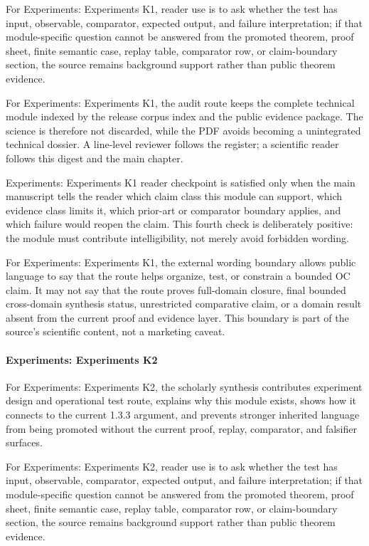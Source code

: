 For Experiments: Experiments K1, reader use is to ask whether the test has input, observable, comparator, expected output, and failure interpretation; if that module-specific question cannot be answered from the promoted theorem, proof sheet, finite semantic case, replay table, comparator row, or claim-boundary section, the source remains background support rather than public theorem evidence.


For Experiments: Experiments K1, the audit route keeps the complete technical module indexed by the release corpus index and the public evidence package. The science is therefore not discarded, while the PDF avoids becoming a unintegrated technical dossier. A line-level reviewer follows the register; a scientific reader follows this digest and the main chapter.


Experiments: Experiments K1 reader checkpoint is satisfied only when the main manuscript tells the reader which claim class this module can support, which evidence class limits it, which prior-art or comparator boundary applies, and which failure would reopen the claim. This fourth check is deliberately positive: the module must contribute intelligibility, not merely avoid forbidden wording.


For Experiments: Experiments K1, the external wording boundary allows public language to say that the route helps organize, test, or constrain a bounded OC claim. It may not say that the route proves full-domain closure, final bounded cross-domain synthesis status, unrestricted comparative claim, or a domain result absent from the current proof and evidence layer. This boundary is part of the source's scientific content, not a marketing caveat.


\paragraph{Experiments: Experiments K2}

For Experiments: Experiments K2, the scholarly synthesis contributes experiment design and operational test route, explains why this module exists, shows how it connects to the current 1.3.3 argument, and prevents stronger inherited language from being promoted without the current proof, replay, comparator, and falsifier surfaces.


For Experiments: Experiments K2, reader use is to ask whether the test has input, observable, comparator, expected output, and failure interpretation; if that module-specific question cannot be answered from the promoted theorem, proof sheet, finite semantic case, replay table, comparator row, or claim-boundary section, the source remains background support rather than public theorem evidence.


